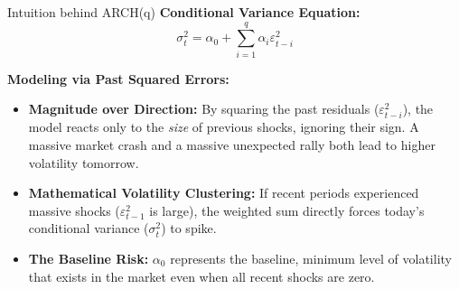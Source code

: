 \documentclass[aspectratio=169]{beamer}
\begin{document}
\begin{frame}{Intuition behind ARCH(q)}
\textbf{Conditional Variance Equation:}
\[
\sigma_t^2 = \alpha_0 + \sum_{i=1}^{q} \alpha_i \varepsilon_{t-i}^2
\]

\textbf{Modeling via Past Squared Errors:}
\begin{itemize}
    \item \textbf{Magnitude over Direction:} By squaring the past residuals ($\varepsilon_{t-i}^2$), the model reacts only to the \textit{size} of previous shocks, ignoring their sign. A massive market crash and a massive unexpected rally both lead to higher volatility tomorrow.
    
    \vspace{0.2cm}
    
    \item \textbf{Mathematical Volatility Clustering:} If recent periods experienced massive shocks ($\varepsilon_{t-1}^2$ is large), the weighted sum directly forces today's conditional variance ($\sigma_t^2$) to spike.
    
    \vspace{0.2cm}
    
    \item \textbf{The Baseline Risk:} $\alpha_0$ represents the baseline, minimum level of volatility that exists in the market even when all recent shocks are zero.
\end{itemize}
\end{frame}
\end{document}
